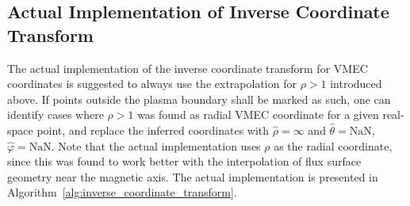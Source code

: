 \subsection{Actual Implementation of Inverse Coordinate Transform}
%
The actual implementation of the inverse coordinate transform for VMEC coordinates
is suggested to always use the extrapolation for $\rho > 1$ introduced above.
%
If points outside the plasma boundary shall be marked as such,
one can identify cases where $\rho > 1$ was found as radial VMEC coordinate
for a given real-space point, and replace the inferred coordinates
with $\hat{\rho} = \infty$ and $\hat{\theta} = \textrm{NaN}$, $\hat{\varphi} = \textrm{NaN}$.
%
Note that the actual implementation uses $\rho$ as the radial coordinate,
since this was found to work better with the interpolation
of flux surface geometry near the magnetic axis.
%
The actual implementation is presented in Algorithm~\ref{alg:inverse_coordinate_transform}.
%
